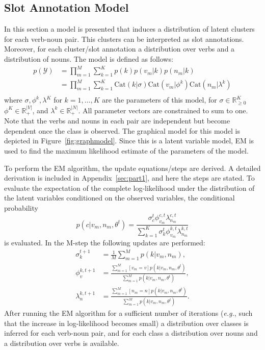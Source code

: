 \documentclass[11pt]{scrartcl}
\newcommand{\thetaold}{\theta^{t}}
\newcommand{\Cat}{\text{Cat}}
\begin{document}
\subsection{Slot Annotation Model} %
\label{sec:verbclasses}
In this section a model is presented that induces a distribution of
latent clusters for each verb-noun pair. This clusters can be
interpreted as slot annotations. Moreover, for each cluster/slot
annotation a distribution over verbs and a distribution of nouns. The
model is defined as follows:
\begin{align*}
  p(\mathcal{Y})
  &= \prod_{m=1}^M \sum_{k=1}^K p(k)p(v_m|k)p(n_m|k) \\
  &= \prod_{m=1}^M \sum_{k=1}^K \Cat(k|\sigma)\Cat(v_m|\phi^k)\Cat(n_m|\lambda^k) \\
\end{align*}
where $\sigma, \phi^k, \lambda^K$ for $k=1,\ldots,K$ are the
parameters of this model, for $\sigma \in \mathbb{R}_{\ge 0}^K$ $\phi^K \in
\mathbb{R}_+^{|V|}$, and $\lambda^k \in \mathbb{R}_+^{|N|}$. All
parameter vectors are constrained to sum to one. Note that the verbs
and nouns in each pair are independent but become dependent once the
class is observed. The graphical model for this model is depicted in
Figure~\ref{fig:graphmodel}. Since this is a latent variable model, EM
is used to find the maximum likelihood estimate of the parameters of
the model.

To perform the EM algorithm, the update equations/steps are derived. A
detailed derivation is included in Appendix~\ref{sec:part1}, and here
the steps are stated. To evaluate the expectation of the complete
log-likelihood under the distribution of the latent variables
conditioned on the observed variables, the conditional probability
\[
  p(c | v_m, n_m , \theta^t) = \frac{\sigma^t_c \phi^{c,t}_{v_m}\lambda^{c, t}_{n_m}} {\sum_{k=1}^K \sigma^t_k \phi^{k,t}_{v_m}\lambda^{k, t}_{n_m}}
\]
is evaluated. In the M-step the following updates are performed:
 \begin{align*}
     \sigma_k^{t+1} &= \frac{1}{M} \sum_{m=1}^M p(k|v_m, n_m), \\
     \phi_v^{k,t+1} &= \frac{\sum_{m=1}^M [v_m = v] p(k|v_m, n_m, \thetaold)}
                     {\sum_{m=1}^M p(k|v_m, n_m, \thetaold)}, \\
     \lambda_n^{k,t+1} &= \frac{\sum_{m=1}^M [n_m = n] p(k|v_m, n_m, \thetaold)}
                     {\sum_{m=1}^M p(k|v_m, n_m, \thetaold)}.
 \end{align*}
 After running the EM algorithm for a sufficient number of iterations
 (\textit{e.g.}, such that the increase in log-likelihood becomes small)
 a distribution over classes is inferred for each verb-noun pair, and
 for each class a distribution over nouns and a distribution over
 verbs is available.
\end{document}
